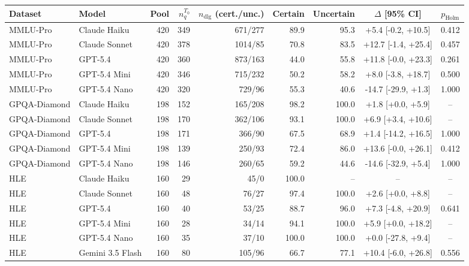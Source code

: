 \begin{tabular}{llrrrrrcc}
\toprule
\textbf{Dataset} & \textbf{Model} & \textbf{Pool} & $n_q^{T_0}$ & $n_{\text{dlg}}$ (cert./unc.) & \textbf{Certain} & \textbf{Uncertain} & $\Delta$ [95\% CI] & $p_{\text{Holm}}$ \\
\midrule
MMLU-Pro & Claude Haiku & 420 & 349 & 671/277 & 89.9 & 95.3 & +5.4 [-0.2, +10.5] & 0.412 \\
MMLU-Pro & Claude Sonnet & 420 & 378 & 1014/85 & 70.8 & 83.5 & +12.7 [-1.4, +25.4] & 0.457 \\
MMLU-Pro & GPT-5.4 & 420 & 360 & 873/163 & 44.0 & 55.8 & +11.8 [-0.0, +23.3] & 0.261 \\
MMLU-Pro & GPT-5.4 Mini & 420 & 346 & 715/232 & 50.2 & 58.2 & +8.0 [-3.8, +18.7] & 0.500 \\
MMLU-Pro & GPT-5.4 Nano & 420 & 320 & 729/96 & 55.3 & 40.6 & -14.7 [-29.9, +1.3] & 1.000 \\
GPQA-Diamond & Claude Haiku & 198 & 152 & 165/208 & 98.2 & 100.0 & +1.8 [+0.0, +5.9] & -- \\
GPQA-Diamond & Claude Sonnet & 198 & 170 & 362/106 & 93.1 & 100.0 & +6.9 [+3.4, +10.6] & -- \\
GPQA-Diamond & GPT-5.4 & 198 & 171 & 366/90 & 67.5 & 68.9 & +1.4 [-14.2, +16.5] & 1.000 \\
GPQA-Diamond & GPT-5.4 Mini & 198 & 139 & 250/93 & 72.4 & 86.0 & +13.6 [-0.0, +26.1] & 0.412 \\
GPQA-Diamond & GPT-5.4 Nano & 198 & 146 & 260/65 & 59.2 & 44.6 & -14.6 [-32.9, +5.4] & 1.000 \\
HLE & Claude Haiku & 160 & 29 & 45/0 & 100.0 & -- & -- & -- \\
HLE & Claude Sonnet & 160 & 48 & 76/27 & 97.4 & 100.0 & +2.6 [+0.0, +8.8] & -- \\
HLE & GPT-5.4 & 160 & 40 & 53/25 & 88.7 & 96.0 & +7.3 [-4.8, +20.9] & 0.641 \\
HLE & GPT-5.4 Mini & 160 & 28 & 34/14 & 94.1 & 100.0 & +5.9 [+0.0, +18.2] & -- \\
HLE & GPT-5.4 Nano & 160 & 35 & 37/10 & 100.0 & 100.0 & +0.0 [-27.8, +9.4] & -- \\
HLE & Gemini 3.5 Flash & 160 & 80 & 105/96 & 66.7 & 77.1 & +10.4 [-6.0, +26.8] & 0.556 \\
\bottomrule
\end{tabular}